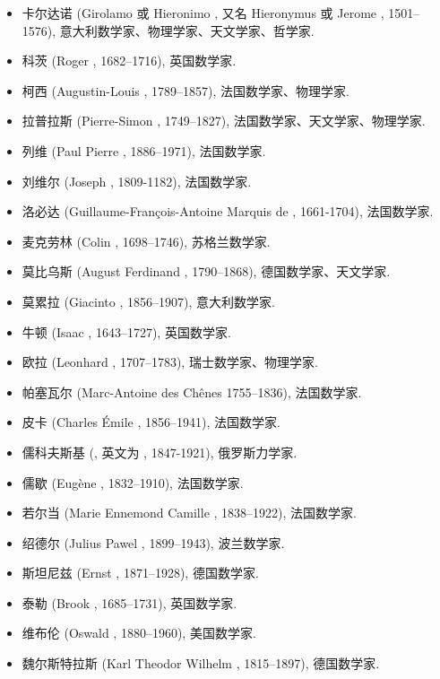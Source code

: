 \begin{itemize}
  \item 卡尔达诺 (Girolamo 或 Hieronimo , 又名 Hieronymus  或 Jerome , 1501--1576), 意大利数学家、物理学家、天文学家、哲学家.
  \item 科茨 (Roger , 1682--1716), 英国数学家.
  \item 柯西 (Augustin-Louis , 1789--1857), 法国数学家、物理学家.
  \item 拉普拉斯 (Pierre-Simon , 1749--1827), 法国数学家、天文学家、物理学家.
  \item 列维 (Paul Pierre , 1886--1971), 法国数学家.
  \item 刘维尔 (Joseph , 1809-1182), 法国数学家.
  \item 洛必达 (Guillaume-François-Antoine Marquis de , 1661-1704), 法国数学家.
  \item 麦克劳林 (Colin , 1698--1746), 苏格兰数学家.
  \item 莫比乌斯 (August Ferdinand , 1790--1868), 德国数学家、天文学家.
  \item 莫累拉 (Giacinto , 1856--1907), 意大利数学家.
  \item 牛顿 (Isaac , 1643--1727), 英国数学家.
  \item 欧拉 (Leonhard , 1707--1783), 瑞士数学家、物理学家.
  \item 帕塞瓦尔 (Marc-Antoine  des Chênes 1755--1836), 法国数学家.
  \item 皮卡 (Charles Émile , 1856--1941), 法国数学家.
  \item 儒科夫斯基 (, 英文为 , 1847-1921), 俄罗斯力学家.
  \item 儒歇 (Eugène , 1832--1910), 法国数学家.
  \item 若尔当 (Marie Ennemond Camille , 1838--1922), 法国数学家.
  \item 绍德尔 (Julius Pawel , 1899--1943), 波兰数学家.
  \item 斯坦尼兹 (Ernst , 1871--1928), 德国数学家.
  \item 泰勒 (Brook , 1685--1731), 英国数学家.
  \item 维布伦 (Oswald , 1880--1960), 美国数学家.
  \item 魏尔斯特拉斯 (Karl Theodor Wilhelm , 1815--1897), 德国数学家.
\end{itemize}
